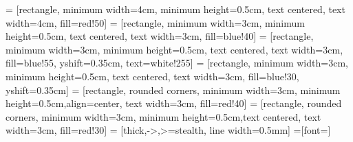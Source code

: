 \documentclass[]{article}
\begin{document}

 = [rectangle, minimum width=4cm, minimum height=0.5cm, text centered, text width=4cm, fill=red!50]
 = [rectangle, minimum width=3cm, minimum height=0.5cm, text centered, text width=3cm, fill=blue!40]
 = [rectangle, minimum width=3cm, minimum height=0.5cm, text centered, text width=3cm, fill=blue!55, yshift=0.35cm, text=white!255]
 = [rectangle, minimum width=3cm, minimum height=0.5cm, text centered, text width=3cm, fill=blue!30, yshift=0.35cm]
 = [rectangle, rounded corners, minimum width=3cm, minimum height=0.5cm,align=center, text width=3cm, fill=red!40]
 = [rectangle, rounded corners, minimum width=3cm, minimum height=0.5cm,text centered, text width=3cm, fill=red!30]
 = [thick,->,>=stealth, line width=0.5mm]
=[font=\scriptsize]
\end{document}
